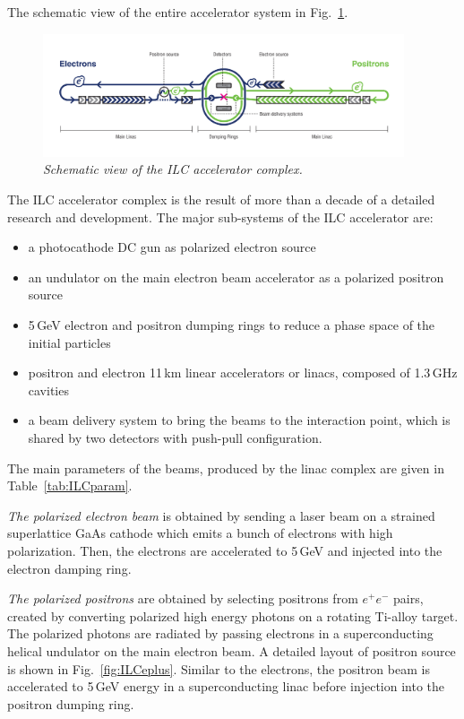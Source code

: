 The schematic view of the entire accelerator system in  Fig.~\ref{fig:ILCScheme}. 
\begin{figure}[H]
{\centering
    \includegraphics[width=0.95\textwidth]{graphics/ILC_scheme.jpg}
    \caption{\sl Schematic view of the ILC accelerator complex.}
    \label{fig:ILCScheme}
  }
\end{figure}
The ILC accelerator complex is the result of more than a decade of a detailed research and development. 
The major sub-systems of the ILC accelerator are:
\begin{itemize}
\item a photocathode DC gun as polarized electron source
\item an undulator on the main electron beam accelerator as a polarized positron source
\item 5\,GeV electron and positron dumping rings to reduce a phase space of the initial particles
\item positron and electron 11\,km linear accelerators or linacs, composed of 1.3\,GHz cavities
\item a beam delivery system to bring the beams to the interaction point, which is shared by two detectors with push-pull configuration.
\end{itemize}
The main parameters of the beams, produced by the linac complex are given in Table~\ref{tab:ILCparam}.

\textit{The polarized electron beam} is obtained by sending a laser beam on a strained superlattice GaAs cathode which emits a bunch of electrons with high polarization. Then, the electrons are accelerated to 5\,GeV and injected into the electron damping ring.

\textit{The polarized positrons} are obtained by selecting positrons from $e^+ e^-$ pairs, created by converting polarized high energy photons on a rotating Ti-alloy target. The polarized photons are radiated by passing electrons in a superconducting helical undulator on the main electron beam.
A detailed layout of positron source is shown in Fig.~\ref{fig:ILCeplus}.
Similar to the electrons, the positron beam is accelerated to 5\,GeV energy in a superconducting linac before injection into the positron dumping ring. 

